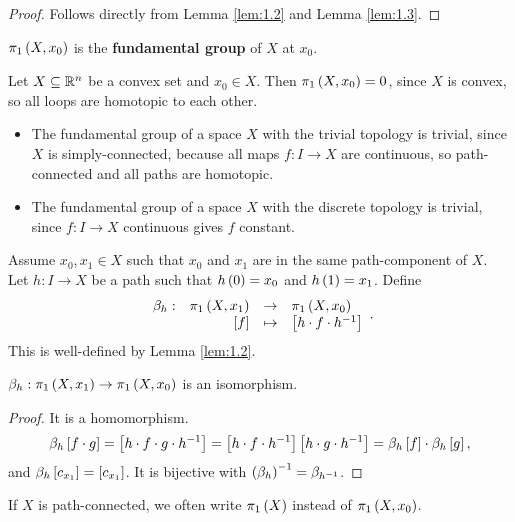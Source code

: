 \begin{proof}
Follows directly from Lemma \ref{lem:1.2} and Lemma \ref{lem:1.3}.
\end{proof}

\begin{definition*}
$ \pi_1\rb{X, x_0} $ is the \textbf{fundamental group} of $ X $ at $ x_0 $.
\end{definition*}

\begin{example*}
Let $ X \subseteq \R^n $ be a convex set and $ x_0 \in X $. Then $ \pi_1\rb{X, x_0} = 0 $, since $ X $ is convex, so all loops are homotopic to each other.
\end{example*}

\begin{example*}
\hfill
\begin{itemize}
\item The fundamental group of a space $ X $ with the trivial topology is trivial, since $ X $ is simply-connected, because all maps $ f : I \to X $ are continuous, so path-connected and all paths are homotopic.
\item The fundamental group of a space $ X $ with the discrete topology is trivial, since $ f : I \to X $ continuous gives $ f $ constant.
\end{itemize}
\end{example*}

Assume $ x_0, x_1 \in X $ such that $ x_0 $ and $ x_1 $ are in the same path-component of $ X $. Let $ h : I \to X $ be a path such that $ h\rb{0} = x_0 $ and $ h\rb{1} = x_1 $. Define
$$ \function[\beta_h]{\pi_1\rb{X, x_1}}{\pi_1\rb{X, x_0}}{\sb{f}}{\sb{h \cdot f \cdot h^{-1}}}. $$
This is well-defined by Lemma \ref{lem:1.2}.

\begin{proposition}
$ \beta_h : \pi_1\rb{X, x_1} \to \pi_1\rb{X, x_0} $ is an isomorphism.
\end{proposition}

\begin{proof}
It is a homomorphism.
$$ \beta_h\sb{f \cdot g} = \sb{h \cdot f \cdot g \cdot h^{-1}} = \sb{h \cdot f \cdot h^{-1}}\sb{h \cdot g \cdot h^{-1}} = \beta_h\sb{f} \cdot \beta_h\sb{g}, $$
and $ \beta_h\sb{c_{x_1}} = \sb{c_{x_1}} $. It is bijective with $ \rb{\beta_h}^{-1} = \beta_{h^{-1}} $.
\end{proof}

If $ X $ is path-connected, we often write $ \pi_1\rb{X} $ instead of $ \pi_1\rb{X, x_0} $.

